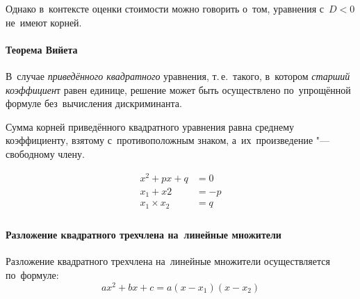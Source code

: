 \documentclass[]{scrartcl}
\begin{document}
Однако в~контексте оценки стоимости можно говорить о~том, уравнения с~$D<0$ не~имеют корней.

\paragraph{Теорема Вийета}
В~случае \emph{приведённого квадратного} уравнения, т.\,е.~такого, в~котором \emph{старший коэффициен}т равен единице, решение может быть осуществлено по~упрощённой формуле без~вычисления дискриминанта. 
\begin{theorem}
	Сумма корней приведённого квадратного уравнения равна среднему коэффициенту, взятому с~противоположным знаком, а~их~произведение "--- свободному члену.
\end{theorem}
\begin{equation}\label{Wijet}
\begin{aligned}
x^2+px+q&=0\\
x_1+x2&=-p\\
x_1 \times x_2 &= q\\
\end{aligned}
\end{equation}

\paragraph{Разложение квадратного трехчлена на~линейные множители}
Разложение квадратного трехчлена на~линейные множители осуществляется по~формуле:
\begin{equation}\label{eq:square-polynom-decomposition}
ax^2+bx+c=a(x-x_1)(x-x_2)
\end{equation}
\end{document}

